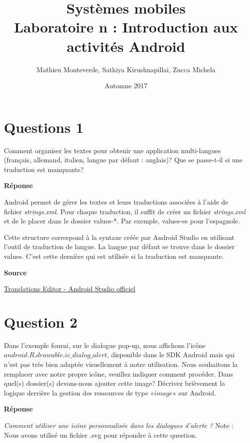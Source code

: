 \documentclass[francais,12pt]{article}
\title{Systèmes mobiles \\ Laboratoire n\textordmasculine1 : Introduction aux activités Android}
\author{Mathieu Monteverde, Sathiya Kirushnapillai, Zucca Michela}
\date{Automne 2017}
\begin{document}
	\maketitle
    
    \setlength{\parskip}{1em}
    
    \section*{Questions 1}

        Comment organiser les textes pour obtenir une application multi-langues (français, allemand, italien, langue par défaut : anglais)? Que se passe-t-il si une traduction est manquante? \par
        
        {\color[rgb]{0,0.5,0.23}\textbf{Réponse}}
        
        Android permet de gérer les textes et leurs traductions associées à l'aide de fichier \textit{strings.xml}. Pour chaque traduction, il suffit de créer un fichier \textit{strings.xml} et de le placer dans le dossier values-*. Par exemple, values-es pour l'espagnole.\par

        Cette structure correspond à la syntaxe créée par Android Studio en utilisant l'outil de traduction de langue. La langue par défaut se trouve dans le dossier values. C'est cette dernière qui est utilisée si la traduction est manquante.
        
        \textbf{Source}
        
        
        \href{https://developer.android.com/studio/write/translations-editor.html}{Translations Editor - Android Studio officiel}
        

	\section*{Question 2}
		Dans l'exemple fourni, sur le dialogue pop-up, nous affichons l'icône $android.R.drawable.ic\_dialog\_alert$, disponible dans le SDK Android mais qui n'est pas très bien adaptée visuellement à notre utilisation. Nous souhaitons la remplacer avec notre propre icône, veuillez indiquer comment procéder. Dans quel(s) dossier(s) devons-nous ajouter cette image? Décrivez brièvement la logique derrière la gestion des ressources de type $« image »$ sur Android. 
		
		{\color[rgb]{0,0.5,0.23}\textbf{Réponse}}
		
		\textit{Comment utiliser une icône personnalisée dans les dialogues d'alerte ?}
		Note : Nous avons utilisé un fichier .svg pour répondre à cette question.
		
\end{document}
